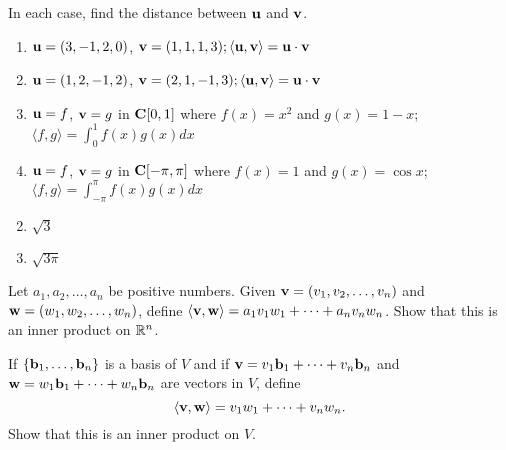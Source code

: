 \begin{multicols}{2}
\begin{ex}
\begin{sol}
\begin{enumerate}[label={\alph*.}]
\end{enumerate}
\end{sol}
\end{ex}

\begin{ex}
In each case, find the distance between $\textbf{u}$ and $\textbf{v}$.

\begin{enumerate}[label={\alph*.}]
\item $\textbf{u} = (3, -1, 2, 0)$, $\textbf{v} = (1, 1, 1, 3); 
\langle \textbf{u}, \textbf{v} \rangle = \textbf{u} \cdot \textbf{v}$

\item $\textbf{u} = (1,  2, -1, 2)$, $\textbf{v} = (2, 1, -1, 3); 
\langle \textbf{u}, \textbf{v} \rangle = \textbf{u} \cdot \textbf{v}$

\item $\textbf{u} = f$, $\textbf{v} = g $ in $\textbf{C}[0, 1]$ where $f(x) = x^2 $ and $g(x) = 1 - x$; $\langle f, g \rangle = \int_{0}^{1} f(x)g(x)dx$

\item $\textbf{u} = f$, $\textbf{v} = g $ in $\textbf{C}[-\pi, \pi]$ where $f(x) = 1$ and $g(x) = \cos x$; $\langle f, g \rangle = \int_{-\pi}^{\pi} f(x)g(x)dx$
\end{enumerate}
\begin{sol}
\begin{enumerate}[label={\alph*.}]
\setcounter{enumi}{1}
\item  $\sqrt{3}$

\setcounter{enumi}{3}
\item  $\sqrt{3\pi}$

\end{enumerate}
\end{sol}
\end{ex}

\begin{ex} \label{ex:10_1_5}
Let $a_{1}, a_{2}, \dots, a_{n}$ be positive numbers. Given $\textbf{v} = (v_{1}, v_{2}, \dots, v_{n})$ and $\textbf{w} = (w_{1}, w_{2}, \dots, w_{n})$, define $\langle\textbf{v}, \textbf{w}\rangle = a_{1}v_{1}w_{1} + \dots + a_{n}v_{n}w_{n}$. Show that this is an inner product on $\mathbb{R}^n$.
\end{ex}

\begin{ex}
If $\{\textbf{b}_{1}, \dots, \textbf{b}_{n}\}$ is a basis of $V$ and if
$\textbf{v} = v_1\textbf{b}_1 + \dots + v_n\textbf{b}_n$ and 
$\textbf{w} = w_1\textbf{b}_1 + \dots + w_n\textbf{b}_n$ are vectors in $V$, define
\begin{equation*}
\langle \textbf{v}, \textbf{w} \rangle = v_1w_1 + \dots + v_nw_n .
\end{equation*}
Show that this is an inner product on $V$.
\end{ex}


\end{multicols}
